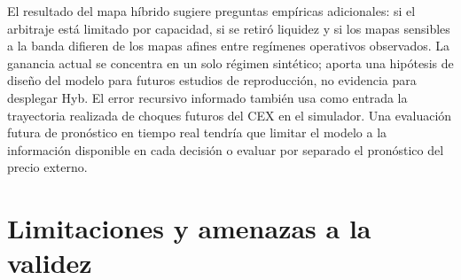 \begin{samepage}
El resultado del mapa híbrido sugiere preguntas empíricas adicionales: si el arbitraje está limitado por capacidad, si se retiró liquidez y si los mapas sensibles a la banda difieren de los mapas afines entre regímenes operativos observados. La ganancia actual se concentra en un solo régimen sintético; aporta una hipótesis de diseño del modelo para futuros estudios de reproducción, no evidencia para desplegar Hyb. El error recursivo informado también usa como entrada la trayectoria realizada de choques futuros del CEX en el simulador. Una evaluación futura de pronóstico en tiempo real tendría que limitar el modelo a la información disponible en cada decisión o evaluar por separado el pronóstico del precio externo.

\end{samepage}

\section{Limitaciones y amenazas a la validez}


